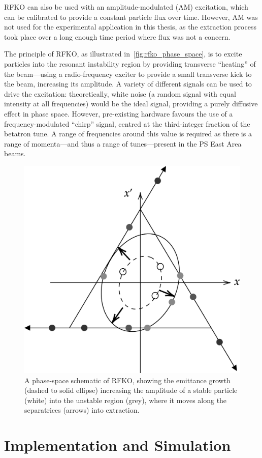\documentclass[a4paper,twoside,11pt]{report}
\begin{document}
RFKO can also be used with an amplitude-modulated (AM) excitation, which can be calibrated to provide a constant particle flux over time. However, AM was not used for the experimental application in this thesis, as the extraction process took place over a long enough time period where flux was not a concern.

The principle of RFKO, as illustrated in~\autoref{fig:rfko_phase_space}, is to excite particles into the resonant instability region by providing transverse ``heating'' of the beam---using a radio-frequency exciter to provide a small transverse kick to the beam, increasing its amplitude. A variety of different signals can be used to drive the excitation: theoretically, white noise (a random signal with equal intensity at all frequencies) would be the ideal signal, providing a purely diffusive effect in phase space. However, pre-existing hardware favours the use of a frequency-modulated ``chirp'' signal, centred at the third-integer fraction of the betatron tune. A range of frequencies around this value is required as there is a range of momenta---and thus a range of tunes---present in the PS East Area beams. 

\begin{figure}
  \centering
  \includegraphics*[width=0.6\linewidth]{rfko-phase-space-schematic.png}
  \caption[Phase-space schematic of RFKO slow extraction]{A phase-space schematic of RFKO, showing the emittance growth (dashed to solid ellipse) increasing the amplitude of a stable particle (white) into the unstable region (grey), where it moves along the separatrices (arrows) into extraction.}\label{fig:rfko_phase_space}
\end{figure}

\chapter{Implementation and Simulation}
\end{document}
